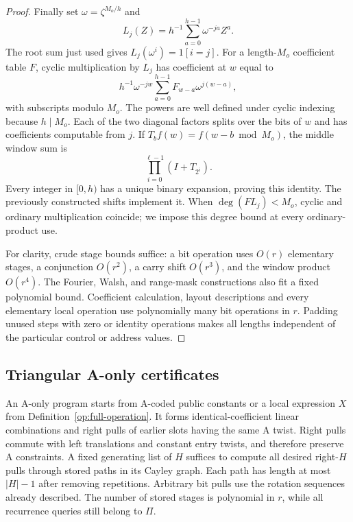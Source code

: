 \begin{proof}
Finally set $\omega=\zeta^{M_o/h}$ and
\begin{equation}\label{op:lagrange}
 L_j(Z)=h^{-1}\sum_{a=0}^{h-1}\omega^{-ja}Z^a.
\end{equation}
The root sum just used gives $L_j(\omega^i)=1[i=j]$.
For a length-$M_o$ coefficient table $F$, cyclic multiplication by
$L_j$ has coefficient at $w$ equal to
\begin{equation}\label{op:lagrange-convolution}
 h^{-1}\omega^{-jw}\sum_{a=0}^{h-1}F_{w-a}\omega^{j(w-a)},
\end{equation}
with subscripts modulo $M_o$.  The powers are well defined under
cyclic indexing because $h\mid M_o$.  Each of the two diagonal
factors splits over the bits of $w$ and has coefficients computable
from $j$.  If $T_bf(w)=f(w-b\bmod M_o)$, the middle window sum is
\[
                    \prod_{i=0}^{\ell-1}(I+T_{2^i}).
\]
Every integer in $[0,h)$ has a unique binary expansion, proving this
identity.  The previously constructed shifts implement it.
When $\deg(F L_j)<M_o$, cyclic and ordinary multiplication coincide;
we impose this degree bound at every ordinary-product use.

For clarity, crude stage bounds suffice: a bit operation uses $O(r)$
elementary stages, a conjunction $O(r^2)$, a carry shift $O(r^3)$,
and the window product $O(r^4)$.  The Fourier, Walsh, and range-mask
constructions also fit a fixed polynomial bound.  Coefficient
calculation, layout descriptions and every elementary local operation
use polynomially many bit operations in $r$.  Padding unused steps
with zero or identity operations makes all lengths independent of
the particular control or address values.
\end{proof}

\subsection{Triangular A-only certificates}

An A-only program starts from A-coded public constants or a local
expression $X$ from Definition~\ref{op:full-operation}.  It forms
identical-coefficient linear combinations and right pulls of earlier
slots having the same A twist.  Right pulls commute with left
translations and constant entry twists, and therefore preserve A
constraints.  A fixed generating list of $H$ suffices to compute all
desired right-$H$ pulls through stored paths in its Cayley graph.
Each path has length at most $|H|-1$ after removing repetitions.
Arbitrary bit pulls use the rotation sequences already described.
The number of stored stages is polynomial in $r$, while all recurrence
queries still belong to $\Pi$.


